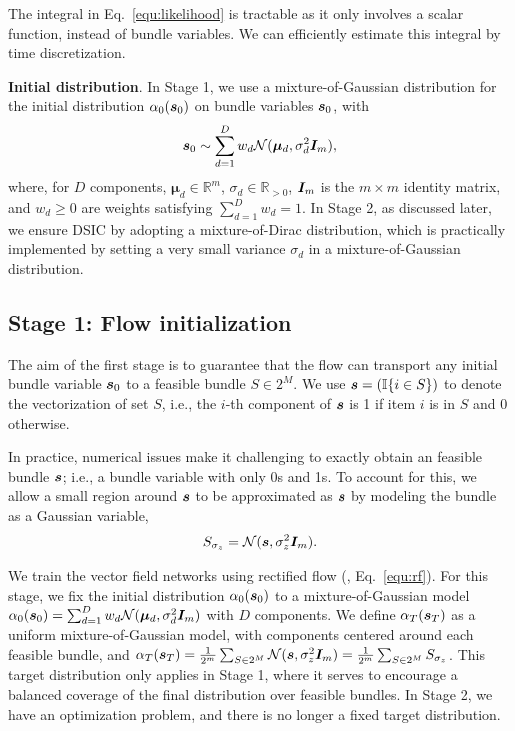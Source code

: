 The integral in Eq.~\ref{equ:likelihood} 
is tractable as it only involves a scalar function, instead of bundle variables.
We can efficiently estimate this integral by time discretization. 

\textbf{Initial distribution}. In Stage 1, we use a mixture-of-Gaussian distribution for
the initial distribution $\alpha_0({\bm{s}}_0)$ on bundle variables ${\bm{s}}_0$, with
%
\begin{align}
    {\bm{s}}_0 \sim\sum_{d=1}^D w_d \mathcal{N}(\bm\mu_d, \sigma_d^2{\bm{I}}_m),\label{equ:init_dist}
\end{align}
where, for $D$ components,
$\bm\mu_d\in\mathbb{R}^m$, $\sigma_d\in\mathbb{R}_{>0}$, ${\bm{I}}_m$ is the $m\times m$ identity matrix, and $w_d\geq 0$ are weights satisfying $\sum_{d=1}^D w_d=1$. In Stage 2, as discussed later, we ensure DSIC by adopting a mixture-of-Dirac distribution, which is practically implemented by setting a very small variance $\sigma_d$ in a mixture-of-Gaussian distribution.


\subsection{Stage 1: Flow initialization}

The aim of the first stage is to guarantee that the flow can transport any initial bundle variable ${\bm{s}}_0$ to a feasible bundle $S\in 2^M$.  We use ${\bm{s}}=(\mathbb{I}{\{i\in S\}})$ to denote the vectorization of set $S$, i.e., the $i$-th component of ${\bm{s}}$ is 1 if item $i$ is in $S$ and 0 otherwise.

In practice, numerical issues make it challenging to exactly obtain an feasible bundle ${\bm{s}}$; i.e., a bundle variable
with only 0s and 1s. To account for this, we allow a small region around ${\bm{s}}$ to be approximated as ${\bm{s}}$ by modeling the bundle as a Gaussian variable,
%
\begin{align}
    S_{\sigma_z} = \mathcal{N}({\bm{s}}, \sigma_z^2{\bm{I}}_m).
\end{align}

We train the vector field networks using rectified flow (\citet{liu2022flow}, Eq.~\ref{equ:rf}). For this  stage, we fix the initial distribution $\alpha_0({\bm{s}}_0)$ to a mixture-of-Gaussian model $\alpha_0({\bm{s}}_0)=\sum_{d=1}^D w_d \mathcal{N}(\bm\mu_d, \sigma_d^2{\bm{I}}_m)$ with $D$ components.
We  define
$\alpha_T({\bm{s}}_T)$ as a uniform mixture-of-Gaussian model, with  components centered around each feasible bundle, and
$\alpha_T({\bm{s}}_T)=\frac{1}{2^m}\sum_{S\in 2^M} \mathcal{N}({\bm{s}}, \sigma_z^2{\bm{I}}_m)=\frac{1}{2^m}\sum_{S\in 2^M}S_{\sigma_z}$.
This target distribution only applies in Stage 1, where it serves to encourage a balanced coverage of the final distribution over feasible bundles. In Stage 2, we have an optimization problem, and there is no longer a fixed target distribution.
%

